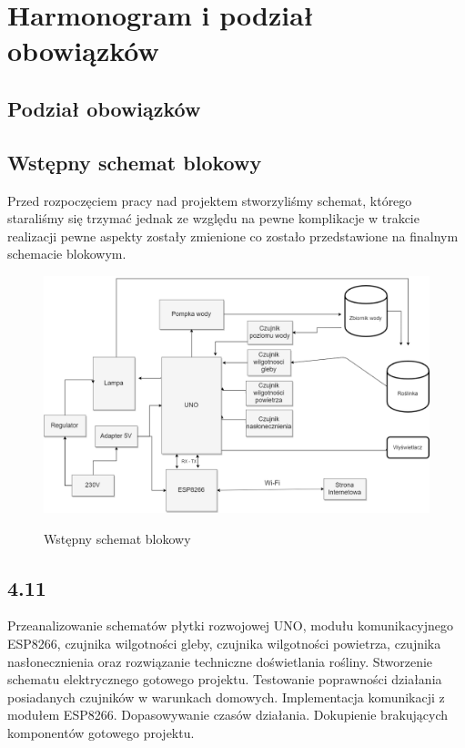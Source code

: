 \documentclass[12pt]{article}
\begin{document}
\section{Harmonogram i podział obowiązków}

\subsection{Podział obowiązków}

\subsection{Wstępny schemat blokowy}
Przed rozpoczęciem pracy nad projektem stworzyliśmy schemat, którego staraliśmy się trzymać jednak ze względu na pewne komplikacje w trakcie realizacji pewne aspekty zostały zmienione co zostało przedstawione na finalnym schemacie blokowym.
\begin{figure}[!h]
	\begin{center}
		{\includegraphics[width=16cm]{schemat_blokowy.png}}
	\end{center}
	\caption{Wstępny schemat blokowy}
\end{figure}


\subsection{4.11}
Przeanalizowanie schematów płytki rozwojowej UNO, modułu komunikacyjnego ESP8266, czujnika wilgotności gleby, czujnika wilgotności powietrza, czujnika nasłonecznienia oraz rozwiązanie techniczne doświetlania rośliny. Stworzenie schematu elektrycznego gotowego projektu. Testowanie poprawności działania posiadanych czujników w warunkach domowych. Implementacja komunikacji z modułem ESP8266. Dopasowywanie czasów działania. 
Dokupienie brakujących komponentów gotowego projektu. 
\end{document}
